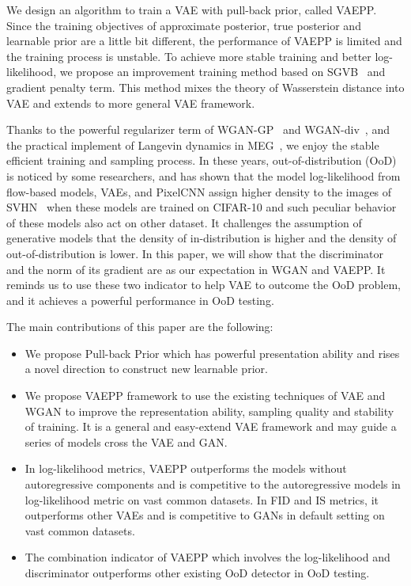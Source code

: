 We design an algorithm to train a VAE with pull-back prior, called VAEPP. Since the training objectives of approximate posterior, true posterior and learnable prior are a little bit different, the performance of VAEPP is limited and the training process is unstable. To achieve more stable training and better log-likelihood, we propose an improvement training method based on SGVB~\cite{kingma2014auto} and gradient penalty term. This method mixes the theory of Wasserstein distance into VAE and extends to more general VAE framework. 

Thanks to the powerful regularizer term of WGAN-GP~\cite{gulrajani2017improved} and WGAN-div~\cite{wu2018wasserstein}, and the practical implement of Langevin dynamics in MEG~\cite{kumar2019maximum}, we enjoy the stable efficient training and sampling process. In these years, out-of-distribution (OoD) is noticed by some researchers, and \cite{nalisnick2018deep} has shown that the model log-likelihood from flow-based models, VAEs, and PixelCNN assign higher density to the images of SVHN~\cite{netzer2011reading} when these models are trained on CIFAR-10 and such peculiar behavior of these models also act on other dataset. It challenges the assumption of generative models that the density of in-distribution is higher and the density of out-of-distribution is lower. In this paper, we will show that the discriminator and the norm of its gradient are as our expectation in WGAN and VAEPP. It reminds us to use these two indicator to help VAE to outcome the OoD problem, and it achieves a powerful performance in OoD testing.

The main contributions of this paper are the following:
\begin{itemize}
	\item We propose Pull-back Prior which has powerful presentation ability and rises a novel direction to construct new learnable prior. 
	\item We propose VAEPP framework to use the existing techniques of VAE and WGAN to improve the representation ability, sampling quality and stability of training. It is a general and easy-extend VAE framework and may guide a series of models cross the VAE and GAN. 
	\item In log-likelihood metrics, VAEPP outperforms the models without autoregressive components and is competitive to the autoregressive models in log-likelihood metric on vast common datasets. In FID and IS metrics, it outperforms other VAEs and is competitive to GANs in default setting on vast common datasets. 
	\item The combination indicator of VAEPP which involves the log-likelihood and discriminator outperforms other existing OoD detector in OoD testing.
\end{itemize}
